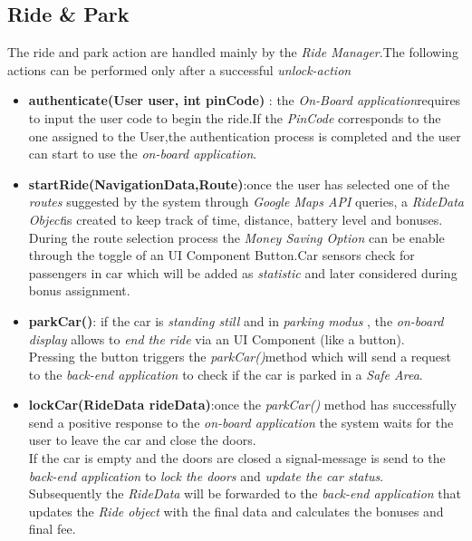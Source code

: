 \subsection{Ride \& Park}
The ride and park action are handled mainly by the \emph{Ride Manager}.The following actions can be performed only after a successful \emph{unlock-action}\\
\begin{itemize}
\item \textbf{authenticate(User user, int pinCode)} : the \emph{On-Board application}requires to input the user code to begin the ride.If the \emph{PinCode} corresponds to the one assigned to the User,the authentication process is completed and the user can start to use the \emph{on-board application}.

\item \textbf{startRide(NavigationData,Route)}:once the user has selected one of the \emph{routes} suggested by the system through \emph{Google Maps API} queries, a
\emph{RideData Object}is created to keep track of time, distance, battery level and bonuses. During the route selection process the \emph{Money Saving Option} can be enable through the toggle of an UI Component Button.Car sensors check for passengers in car which will be added as \emph{statistic} and later considered during bonus assignment.

\item \textbf{parkCar()}: if the car is \emph{standing still} and in \emph{parking modus} , the \emph{on-board display} allows to \emph{end the ride} via an UI Component (like a button).\\
Pressing the button triggers the \emph{parkCar()}method which will send a request to the \emph{back-end application} to check if the car is parked in a \emph{Safe Area}.

\item \textbf{lockCar(RideData rideData)}:once the \emph{parkCar()} method has successfully 
send a positive response to the \emph{on-board application} the system waits for the user to leave the car and close the doors.\\
If the car is empty and the doors are closed a signal-message is send to the \emph{back-end application} to \emph{lock the doors} and \emph{update the car status}.\\Subsequently the \emph{RideData} will be forwarded to the \emph{back-end application} that updates the \emph{Ride object} with the final data and calculates the bonuses and final fee.
\end{itemize}


